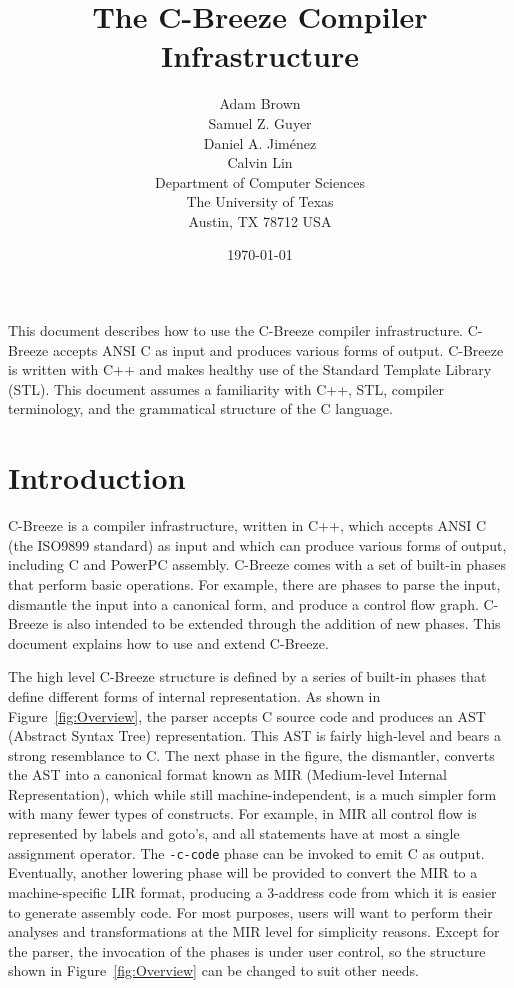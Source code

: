 \documentclass[10pt]{article}
\begin{document}
\title{The C-Breeze Compiler Infrastructure}
\author{
Adam Brown \\
Samuel Z. Guyer \\ 
Daniel A. Jim\'enez \\
Calvin Lin \\
  Department of Computer Sciences \\
  The University of Texas \\
  Austin, TX 78712 USA }
\date{\today}

\maketitle

This document describes how to use the C-Breeze compiler infrastructure.
C-Breeze accepts ANSI C as input and produces various forms of output.
C-Breeze is written with C++ and makes healthy use of the Standard Template
Library (STL).  This document assumes a familiarity with C++, STL, compiler
terminology, and the grammatical structure of the C language.


\section{Introduction}
\label{sec:Introduction}

    C-Breeze is a compiler infrastructure, written in C++, which accepts ANSI
C (the ISO9899 standard) as input and which can produce various forms of
output, including C and PowerPC assembly.  C-Breeze comes with a set of
built-in phases that perform basic operations.  For example, there are phases
to parse the input, dismantle the input into a canonical form, and produce a
control flow graph.  C-Breeze is also intended to be extended through the
addition of new phases.  This document explains how to use and extend
C-Breeze.



    The high level C-Breeze structure is defined by a series of built-in
phases that define different forms of internal representation.  As shown in
Figure~\ref{fig:Overview}, the parser accepts C source code and produces an
AST (Abstract Syntax Tree) representation.  This AST is fairly high-level and
bears a strong resemblance to C.  The next phase in the figure, the
dismantler, converts the AST into a canonical format known as MIR
(Medium-level Internal Representation), which while still
machine-independent, is a much simpler form with many fewer types of
constructs.  For example, in MIR all control flow is represented by labels
and goto's, and all statements have at most a single assignment operator.
The {\tt -c-code} phase can be invoked to emit C as output.  Eventually,
another lowering phase will be provided to convert the MIR to a
machine-specific LIR format, producing a 3-address code from which it is
easier to generate assembly code.  For most purposes, users will want to
perform their analyses and transformations at the MIR level for simplicity
reasons.  Except for the parser, the invocation of the phases is under user
control, so the structure shown in Figure~\ref{fig:Overview} can be changed
to suit other needs.
\end{document}
